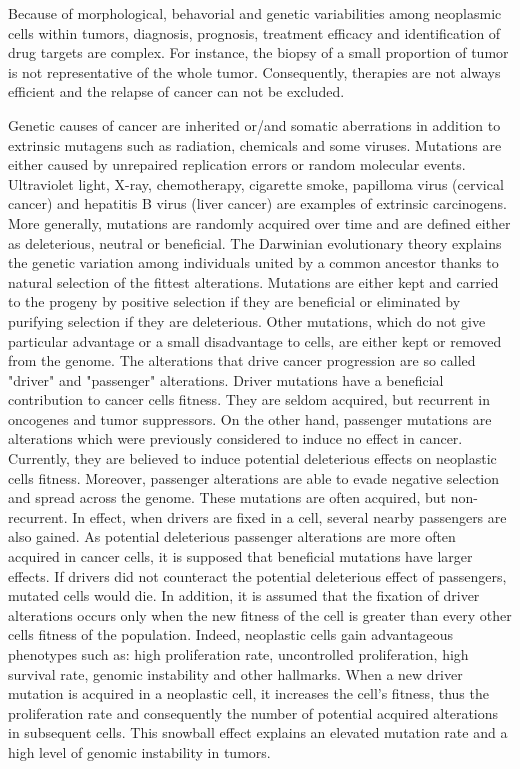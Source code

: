 \documentclass[a4paper]{article}
\begin{document}
\begin{multicols}{2}
Because of morphological, behavorial and genetic variabilities among neoplasmic cells within tumors, diagnosis, prognosis, treatment efficacy and identification of drug targets are complex. For instance, the biopsy of a small proportion of tumor is not representative of the whole tumor. Consequently, therapies are not always efficient and the relapse of cancer can not be excluded. 

Genetic causes of cancer are inherited or/and somatic aberrations in addition to extrinsic mutagens such as radiation, chemicals and some viruses. Mutations are either caused by unrepaired replication errors or random molecular events. Ultraviolet light, X-ray, chemotherapy, cigarette smoke, papilloma virus (cervical cancer) and hepatitis B virus (liver cancer) are examples of extrinsic carcinogens. More generally, mutations are randomly acquired over time and are defined either as deleterious, neutral or beneficial. The Darwinian evolutionary theory explains the genetic variation among individuals united by a common ancestor thanks to natural selection of the fittest alterations\cite{GM}. Mutations are either kept and carried to the progeny by positive selection if they are beneficial or eliminated by purifying selection if they are deleterious. Other mutations, which do not give particular advantage or a small disadvantage to cells, are either kept or removed from the genome. The alterations that drive cancer progression are so called "driver" and "passenger" alterations\cite{BAOCKCK}. Driver mutations have a beneficial contribution to cancer cells fitness. They are seldom acquired, but recurrent in oncogenes and tumor suppressors\cite{FD}. On the other hand, passenger mutations are alterations which were previously considered to induce no effect in cancer\cite{BAOCKCK}. Currently, they are believed to induce potential deleterious effects on neoplastic cells fitness. Moreover, passenger alterations are able to evade negative selection and spread across the genome. These mutations are often acquired, but non-recurrent\cite{FD}. In effect, when drivers are fixed in a cell, several nearby passengers are also gained. As potential deleterious passenger alterations are more often acquired in cancer cells, it is supposed that beneficial mutations have larger effects. If drivers did not counteract the potential deleterious effect of passengers, mutated cells would die. In addition, it is assumed that the fixation of driver alterations occurs only when the new fitness of the cell is greater than every other cells fitness of the population\cite{FD}. Indeed, neoplastic cells gain advantageous phenotypes such as: high proliferation rate, uncontrolled proliferation, high survival rate, genomic instability and other hallmarks. 
When a new driver mutation is acquired in a neoplastic cell, it increases the cell's fitness, thus the proliferation rate and consequently the number of potential acquired alterations in subsequent cells. This snowball effect explains an elevated mutation rate and a high level of genomic instability in tumors\cite{MKPWR, GM}.


\end{multicols}
\end{document}
